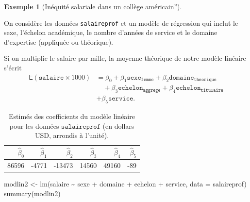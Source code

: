 \documentclass[
  11pt,
  letterpaper,
]{scrbook}
\newenvironment{Shaded}{\begin{snugshade}}{\end{snugshade}}
\newcommand{\AttributeTok}[1]{\textcolor[rgb]{0.40,0.45,0.13}{#1}}
\newcommand{\FunctionTok}[1]{\textcolor[rgb]{0.28,0.35,0.67}{#1}}
\newcommand{\NormalTok}[1]{\textcolor[rgb]{0.00,0.23,0.31}{#1}}
\newcommand{\OtherTok}[1]{\textcolor[rgb]{0.00,0.23,0.31}{#1}}
\newcommand{\SpecialCharTok}[1]{\textcolor[rgb]{0.37,0.37,0.37}{#1}}
\theoremstyle{definition}
\newtheorem{example}{Exemple}[chapter]
\theoremstyle{remark}
\begin{document}
\begin{example}[Inéquité salariale dans un collège
américain'']\protect\hypertarget{exm-inequite-salariale}{}\label{exm-inequite-salariale}

On considère les données \texttt{salaireprof} et un modèle de régression
qui inclut le sexe, l'échelon académique, le nombre d'années de service
et le domaine d'expertise (appliquée ou théorique).

Si on multiplie le salaire par mille, la moyenne théorique de notre
modèle linéaire s'écrit \begin{align*}
\mathsf{E}(\texttt{salaire} \times 1000) &= \beta_0 + \beta_1 \texttt{sexe}_{\texttt{femme}} +\beta_2 \texttt{domaine}_{\texttt{theorique}} \\&\quad +\beta_3 \texttt{echelon}_{\texttt{aggrege}}
+\beta_4 \texttt{echelon}_{\texttt{titulaire}}  \\&+\beta_5 \texttt{service}.
\end{align*}

\hypertarget{tbl-collegecoefs}{}
\begin{table}
\caption{\label{tbl-collegecoefs}Estimés des coefficients du modèle linéaire pour les données
\(\texttt{salaireprof}\) (en dollars USD, arrondis à l'unité). }\tabularnewline

\centering
\begin{tabular}{rrrrrr}
\toprule
\(\widehat{\beta}_0\) & \(\widehat{\beta}_1\) & \(\widehat{\beta}_2\) & \(\widehat{\beta}_3\) & \(\widehat{\beta}_4\) & \(\widehat{\beta}_5\)\\
\midrule
86596 & -4771 & -13473 & 14560 & 49160 & -89\\
\bottomrule
\end{tabular}
\end{table}

\begin{Shaded}
\begin{Highlighting}[]
\NormalTok{modlin2 }\OtherTok{\textless{}{-}} \FunctionTok{lm}\NormalTok{(salaire }\SpecialCharTok{\textasciitilde{}}\NormalTok{  sexe }\SpecialCharTok{+}\NormalTok{ domaine }\SpecialCharTok{+}\NormalTok{ echelon }\SpecialCharTok{+}\NormalTok{ service,}
              \AttributeTok{data =}\NormalTok{ salaireprof)}
\FunctionTok{summary}\NormalTok{(modlin2)}
\end{Highlighting}
\end{Shaded}

\begin{verbatim}


\end{verbatim}
\end{example}
\end{document}
